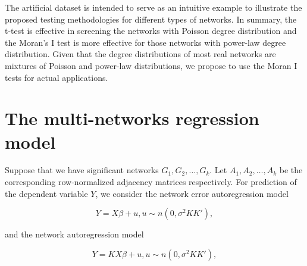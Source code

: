 \documentclass[times, doublespace]{auth}
\begin{document}
The artificial dataset is intended to serve as an intuitive example to illustrate the proposed testing methodologies for different types of networks. In summary, the t-test is effective in screening the networks with Poisson degree distribution and the Moran's I test is more effective for those networks with power-law degree distribution. Given that the degree distributions of most real networks are mixtures of Poisson and power-law distributions, we propose to use the Moran I tests for actual applications.
\newpage
\section{The multi-networks regression model}
Suppose that we have significant networks $G_{1}, G_{2}, \ldots, G_{k}$. Let $A_{1}, A_{2}, \ldots, A_{k}$ be the corresponding row-normalized adjacency matrices respectively. For prediction of the dependent variable $Y$, we consider the network error autoregression model

\begin{equation}
\label{eqn: 7}
Y = X\beta + u,      u \sim n(0, \sigma^{2}KK'),
\end{equation}

\noindent and the network autoregression model

\begin{equation}
\label{eqn: 7a}
Y = KX\beta + u,      u \sim n(0, \sigma^{2}KK'),
\end{equation}
\end{document}
